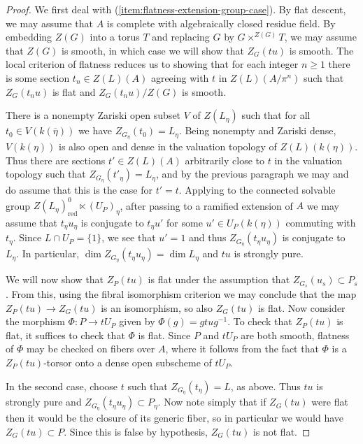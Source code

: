 \documentclass[11pt,reqno]{amsart}
\theoremstyle{definition}
\renewcommand{\rm}{\mathrm}
\begin{document}
\begin{proof}
We first deal with (\ref{item:flatness-extension-group-case}). By flat descent, we may assume that $A$ is complete with algebraically closed residue field. By embedding $Z(G)$ into a torus $T$ and replacing $G$ by $G \times^{Z(G)} T$, we may assume that $Z(G)$ is smooth, in which case we will show that $Z_G(tu)$ is smooth. The local criterion of flatness \cite[Thm.\ 22.1]{Matsumura} reduces us to showing that for each integer $n \geq 1$ there is some section $t_n \in Z(L)(A)$ agreeing with $t$ in $Z(L)(A/\pi^n)$ such that $Z_G(t_n u)$ is flat and $Z_G(t_n u)/Z(G)$ is smooth.\smallskip

There is a nonempty Zariski open subset $V$ of $Z(L_\eta)$ such that for all $t_0 \in V(k(\overline{\eta}))$ we have $Z_{G_\eta}(t_0) = L_\eta$. Being nonempty and Zariski dense, $V(k(\eta))$ is also open and dense in the valuation topology of $Z(L)(k(\eta))$. Thus there are sections $t' \in Z(L)(A)$ arbitrarily close to $t$ in the valuation topology such that $Z_{G_\eta}(t'_\eta) = L_\eta$, and by the previous paragraph we may and do assume that this is the case for $t' = t$. Applying \cite[Lem.\ 2.12]{SteinbergReg} to the connected solvable group $Z(L_\eta)^0_{\rm{red}} \ltimes (U_P)_\eta$, after passing to a ramified extension of $A$ we may assume that $t_\eta u_\eta$ is conjugate to $t_\eta u'$ for some $u' \in U_P(k(\eta))$ commuting with $t_\eta$. Since $L \cap U_P = \{1\}$, we see that $u' = 1$ and thus $Z_{G_\eta}(t_\eta u_\eta)$ is conjugate to $L_\eta$. In particular, $\dim Z_{G_\eta}(t_\eta u_\eta) = \dim L_\eta$ and $tu$ is strongly pure. \smallskip

We will now show that $Z_P(tu)$ is flat under the assumption that $Z_{G_s}(u_s) \subset P_s$. From this, using the fibral isomorphism criterion we may conclude that the map $Z_P(tu) \to Z_G(tu)$ is an isomorphism, so also $Z_G(tu)$ is flat. Now consider the morphism $\Phi: P \to tU_P$ given by $\Phi(g) = gtug^{-1}$. To check that $Z_P(tu)$ is flat, it suffices to check that $\Phi$ is flat. Since $P$ and $tU_P$ are both smooth, flatness of $\Phi$ may be checked on fibers over $A$, where it follows from the fact that $\Phi$ is a $Z_P(tu)$-torsor onto a dense open subscheme of $tU_P$. \smallskip

In the second case, choose $t$ such that $Z_{G_\eta}(t_\eta) = L$, as above. Thus $tu$ is strongly pure and $Z_{G_\eta}(t_\eta u_\eta) \subset P_\eta$. Now note simply that if $Z_G(tu)$ were flat then it would be the closure of its generic fiber, so in particular we would have $Z_G(tu) \subset P$. Since this is false by hypothesis, $Z_G(tu)$ is not flat.
\end{proof}
\end{document}
